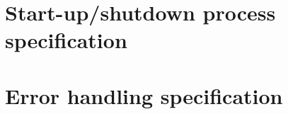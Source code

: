 \section{Start-up/shutdown process specification}
\label{sec:startup-shutdown}

\section{Error handling specification}
\label{sec:error-handling-specification}
%
%
